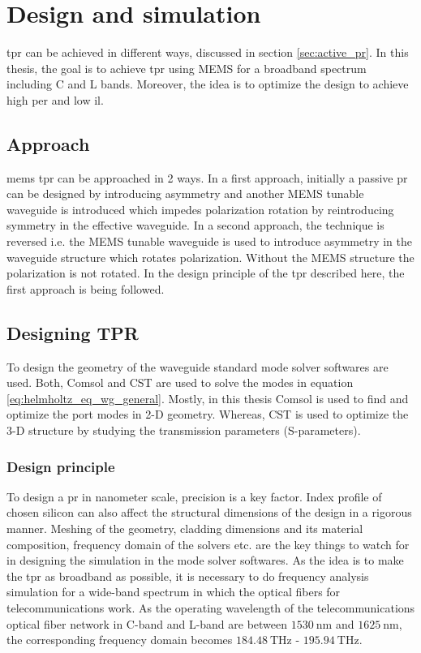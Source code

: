\documentclass[../report.tex]{subfiles}
\begin{document}
	

\chapter{Design and simulation}
\gls{tpr} can be achieved in different ways, discussed in section \ref*{sec:active_pr}. In this thesis, the goal is to achieve \gls{tpr} using MEMS for a broadband spectrum including C and L bands. Moreover, the idea is to optimize the design to achieve high \gls{per} and low \gls{il}.  
	
	\section{Approach}
	\gls{mems} \gls{tpr} can be approached in 2 ways. In a first approach, initially a passive \gls{pr} can be designed by introducing asymmetry and another MEMS tunable waveguide is introduced which impedes polarization rotation by reintroducing symmetry in the effective waveguide. In a second approach, the technique is reversed i.e. the MEMS tunable waveguide is used to introduce asymmetry in the waveguide structure which rotates polarization. Without the MEMS structure the polarization is not rotated. In the design principle of the \gls{tpr} described here, the first approach is being followed.  
	
	\section{Designing TPR}
	To design the geometry of the waveguide standard mode solver softwares are used. Both, Comsol\cite{comsol_2015} and CST \cite{cst_2015} are used to solve the modes in equation \ref{eq:helmholtz_eq_wg_general}. Mostly, in this thesis Comsol is used to find and optimize the port modes in 2-D geometry. Whereas, CST is used to optimize the 3-D structure by studying the transmission parameters (S-parameters).
	
		
		\subsection{Design principle}
To design a \gls{pr} in nanometer scale, precision is a key factor. Index profile of chosen silicon can also affect the structural dimensions of the design in a rigorous manner. Meshing of the geometry, cladding dimensions and its material composition, frequency domain of the solvers etc. are the key things to watch for in designing the simulation in the mode solver softwares. As the idea is to make the \gls{tpr} as broadband as possible, it is necessary to do frequency analysis simulation for a wide-band spectrum in which the optical fibers for telecommunications work. As the operating wavelength of the telecommunications optical fiber network in C-band and L-band are between $\SI{1530}{\nano\metre}$ and $\SI{1625}{\nano\metre}$, the corresponding frequency domain becomes $\SI{184.48}{\THz}$ - $\SI{195.94}{\THz}$.
	
\end{document}
